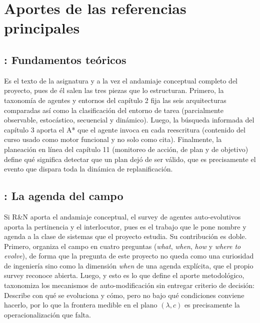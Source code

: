 \section{Aportes de las referencias principales}

\subsection*{\textcite{russellNorvig2020}: Fundamentos teóricos}

Es el texto de la asignatura y a la vez el andamiaje conceptual completo del proyecto,
pues de él salen las tres piezas que lo estructuran. Primero, la taxonomía de agentes y
entornos del capítulo 2 fija las seis arquitecturas comparadas así como la clasificación
del entorno de tarea (parcialmente observable, estocástico, secuencial y dinámico).
Luego, la búsqueda informada del capítulo 3 aporta el A* que el agente invoca en cada
reescritura (contenido del curso usado como motor funcional y no solo como cita).
Finalmente, la planeación en línea del capítulo 11 (monitoreo de acción, de plan y de
objetivo) define qué significa detectar que un plan dejó de ser válido, que es
precisamente el evento que dispara toda la dinámica de replanificación.

\subsection*{\textcite{gao2026selfevolving}: La agenda del campo}

Si R\&N aporta el andamiaje conceptual, el survey de agentes auto-evolutivos aporta la
pertinencia y el interlocutor, pues es el trabajo que le pone nombre y agenda a la clase
de sistemas que el proyecto estudia. Su contribución es doble. Primero, organiza el campo
en cuatro preguntas (\emph{what}, \emph{when}, \emph{how} y \emph{where to evolve}), de
forma que la pregunta de este proyecto no queda como una curiosidad de ingeniería sino
como la dimensión \emph{when} de una agenda explícita, que el propio survey reconoce
abierta. Luego, y esto es lo que define el aporte metodológico, taxonomiza los mecanismos
de auto-modificación sin entregar criterio de decisión: Describe con qué se evoluciona y
cómo, pero no bajo qué condiciones conviene hacerlo, por lo que la frontera medible en el
plano $(\lambda, c)$ es precisamente la operacionalización que falta.

